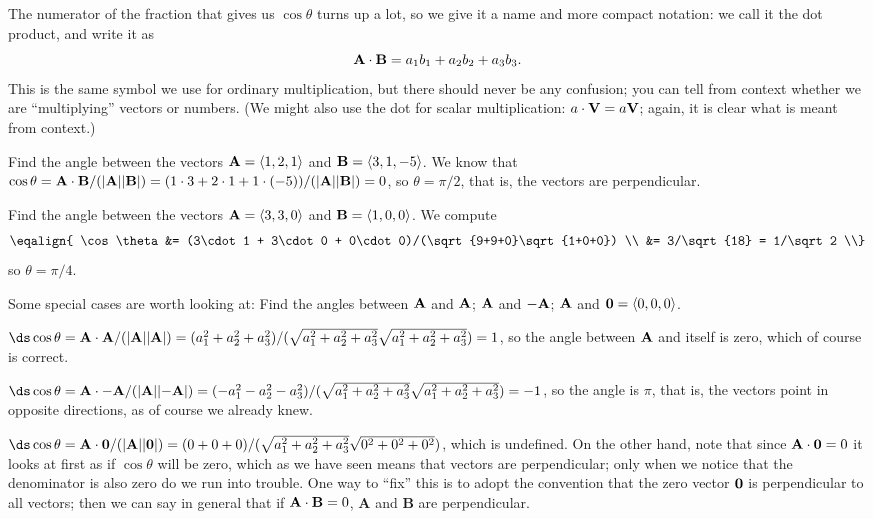The numerator of the fraction that gives us $\cos\theta$ turns up a
lot, so we give it a name and more compact notation: we call it
the {\dfont dot  product\/}, and write it as
$${\bf A}\cdot{\bf B} = a_1b_1+a_2b_2+a_3b_3.$$
This is the same symbol we use for ordinary multiplication, but there
should never be any confusion; you can tell from context whether we
are ``multiplying'' vectors or numbers. (We might also use the dot for
scalar multiplication: $a\cdot{\bf V}=a{\bf V}$; again, it is clear
what is meant from context.)

\begin{example} Find the angle between the vectors ${\bf A}=\langle 1,2,1\rangle$ and
${\bf B}=\langle 3,1,-5\rangle$. We know that
$\cos\theta={\bf A}\cdot{\bf B}/(|{\bf A}||{\bf B}|)=
(1\cdot3 + 2\cdot1 + 1\cdot(-5))/(|{\bf A}||{\bf B}|)=0$, so
$\theta=\pi/2$, that is, the vectors are perpendicular.
\end{example}

\begin{example} Find the angle between the vectors ${\bf A}=\langle 3,3,0\rangle$ and
${\bf B}=\langle 1,0,0\rangle$. We compute
$$\eqalign{
\cos\theta &= (3\cdot1 + 3\cdot0 + 0\cdot0)/(\sqrt{9+9+0}\sqrt{1+0+0}) \\
&= 3/\sqrt{18} = 1/\sqrt2 \\}$$
so $\theta=\pi/4$.
\end{example}

\begin{example} Some special cases are worth looking at: Find the angles
between ${\bf A}$ and ${\bf A}$; ${\bf A}$ and ${\bf -A}$;  ${\bf A}$
and ${\bf 0}=\langle 0,0,0\rangle$.

$\ds \cos\theta= {\bf A}\cdot{\bf A}/(|{\bf A}||{\bf A}|)=(a_1^2+a_2^2+a_3^2)/
(\sqrt{a_1^2+a_2^2+a_3^2}\sqrt{a_1^2+a_2^2+a_3^2})=1$, so the angle
between ${\bf A}$ and itself is zero, which of course is correct.

$\ds\cos\theta={\bf A}\cdot{\bf -A}/(|{\bf A}||{\bf -A}|)=(-a_1^2-a_2^2-a_3^2)/
(\sqrt{a_1^2+a_2^2+a_3^2}\sqrt{a_1^2+a_2^2+a_3^2})=-1$, so the angle
is $\pi$, that is, the vectors point in opposite directions, as of
course we already knew.

$\ds \cos\theta= {\bf A}\cdot{\bf 0}/(|{\bf A}||{\bf 0}|)=(0+0+0)/
(\sqrt{a_1^2+a_2^2+a_3^2}\sqrt{0^2+0^2+0^2})$, which is undefined.
On the other hand, note that since ${\bf A}\cdot{\bf 0}=0$ it looks
at first as if $\cos\theta$ will be zero, which as we have seen means
that vectors are perpendicular; only when we notice that the
denominator is also zero do we run into trouble. One way to ``fix''
this is to adopt the convention that the zero vector ${\bf 0}$ is
perpendicular to all vectors; then we can say in general that if
${\bf A}\cdot{\bf B}=0$, {\bf A} and {\bf B} are perpendicular.
\end{example}

